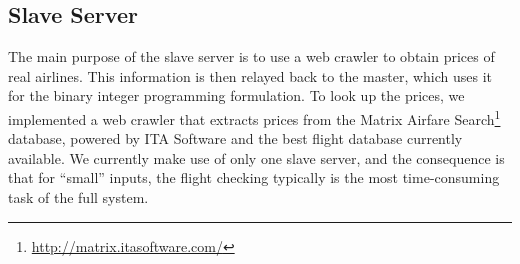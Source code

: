 \documentclass{article}
\begin{document}

\subsection{Slave Server}\label{sec:slave_server}

The main purpose of the slave server is to use a web crawler to obtain prices of real airlines. This information is then relayed back to the master,
which uses it for the binary integer programming formulation. To look up the prices, we implemented a web crawler that extracts prices from the Matrix
Airfare Search\footnote{\url{http://matrix.itasoftware.com/}} database, powered by ITA Software and the best flight database currently available. We
currently make use of only one slave server, and the consequence is that for ``small'' inputs, the flight checking typically is the most
time-consuming task of the full system.

\end{document}
